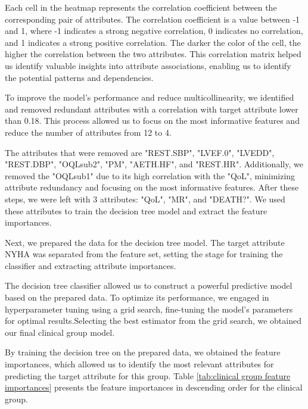         Each cell in the heatmap represents the correlation coefficient between the corresponding pair of attributes. The correlation coefficient is a value between -1 and 1, where -1 indicates a strong negative correlation, 0 indicates no correlation, and 1 indicates a strong positive correlation. The darker the color of the cell, the higher the correlation between the two attributes.  This correlation matrix helped us identify valuable insights into attribute associations, enabling us to identify the potential patterns and dependencies. 

        To improve the model's performance and reduce multicollinearity, we identified and removed redundant attributes with a correlation with target attribute lower than 0.18. This process allowed us to focus on the most informative features and reduce the number of attributes from 12 to 4.
        
        The attributes that were removed are "REST.SBP", "LVEF.0", "LVEDD", "REST.DBP", "OQLsub2", "PM", "AETH.HF", and "REST.HR". Additionally, we removed the "OQLsub1" due to its high correlation with the "QoL", minimizing attribute redundancy and focusing on the most informative features.
        After these steps, we were left with 3 attributes: "QoL", "MR", and "DEATH?". We used these attributes to train the decision tree model and extract the feature importances.

        Next, we prepared the data for the decision tree model. The target attribute NYHA was separated from the feature set, setting the stage for training the classifier and extracting attribute importances.
        
        The decision tree classifier allowed us to construct a powerful predictive model based on the prepared data. To optimize its performance, we engaged in hyperparameter tuning using a grid search, fine-tuning the model's parameters for optimal results.Selecting the best estimator from the grid search, we obtained our final clinical group model.

        By training the decision tree on the prepared data, we obtained the feature importances, which allowed us to identify the most relevant attributes for predicting the target attribute for this group. Table \ref{tab:clinical group feature importances} presents the feature importances in descending order for the clinical group.
        

